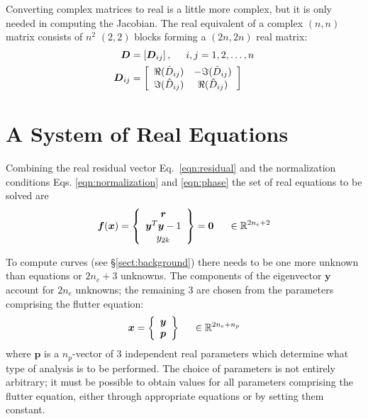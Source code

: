 \documentclass[10pt,openany,twoside]{book}
\numberwithin{equation}{section}   %
\newcommand{\Matrix}[1]{\boldsymbol{#1}}
\newcommand{\Vector}[1]{\boldsymbol{#1}}
\newcommand{\Sectref}[1]{\S\ref{#1}}
\newcommand{\Eqn}[1]{Eq.\ \ref{#1}}
\newcommand{\Eqna}[2]{Eqs. \ref{#1} and \ref{#2}}
\begin{document}
Converting complex matrices to real is a little more complex, but it is only
needed in computing the Jacobian.
The real equivalent of a complex $(n,n)$ matrix consists of $n^2$ $(2,2)$
blocks forming a $(2n,2n)$ real matrix:
\begin{align}
	\Matrix{D} &= \left[\Matrix{D}_{ij} \right], \hspace{5mm}
			i, j = 1, 2, \ldots, n \nonumber \\
	\Matrix{D}_{ij} &= \left[ \begin{array}{cc}
		\Re(\hat{D}_{ij}) & -\Im(\hat{D}_{ij}) \\
		\Im(\hat{D}_{ij}) & \Re(\hat{D}_{ij})
	\end{array}\right]
\end{align}

\section{A System of Real Equations}
Combining the real residual vector \Eqn{eqn:residual} and the normalization conditions
\Eqna{eqn:normalization}{eqn:phase}
the set of real equations to be solved are
\begin{equation}\label{eqn:realeqn}
	\Vector{f}(\Vector{x}) = \left\{\begin{array}{c}
		\Vector{r} \\
		\Vector{y}^T\Vector{y} - 1 \\
		y_{2k} \\
	\end{array} \right\} = \Vector{0} \hspace{0.2in} \in \mathbb{R}^{2n_e+2} \nonumber \\
\end{equation}

To compute curves (see \Sectref{sect:background})
there needs to be one more unknown than equations or $2n_e+3$ unknowns.
The components of the eigenvector $\Vector{y}$ account for $2n_e$ unknowns;
the remaining 3 are chosen from the parameters comprising the flutter equation:
\begin{equation}
	\Vector{x} = \left\{\begin{array}{c}
		\Vector{y} \\
		\Vector{p} \\
	\end{array} \right\} \hspace{0.2in} \in \mathbb{R}^{2n_e+n_p}
\end{equation}
where $\Vector{p}$ is a $n_p$-vector of 3 independent
real parameters which determine what type of analysis is to be performed.
The choice of parameters is not entirely arbitrary; it must be possible to
obtain values for all parameters comprising the flutter equation,
either through appropriate equations or by setting them constant.
\end{document}
